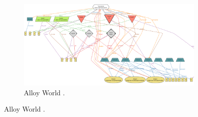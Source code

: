 \begin{figure}
	\begin{figure} [H]
		\begin{center}
			\includegraphics[width=1\linewidth]{Images/AlloyWorld.png}
			\caption{Alloy World .}
			\label{fig: alloy_world}
		\end{center}
	\end{figure}
\end{figure}
%
